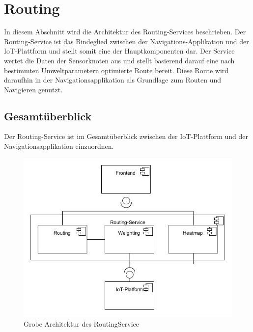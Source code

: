 \section{Routing}
\label{sec:arch:routing}
In diesem Abschnitt wird die Architektur des Routing-Services beschrieben. Der Routing-Service ist das Bindeglied zwischen der Navigations-Applikation und der IoT-Plattform und stellt somit eine der Hauptkomponenten dar. Der Service wertet die Daten der Sensorknoten aus und stellt basierend darauf eine nach bestimmten Umweltparametern optimierte Route bereit. Diese Route wird daraufhin in der Navigationsapplikation als Grundlage zum Routen und Navigieren genutzt.

\subsection{Gesamtüberblick}
Der Routing-Service ist im Gesamtüberblick zwischen der IoT-Plattform und der Navigationsapplikation einzuordnen.
\begin{figure}[htb]
	\centering
	\includegraphics[width=\textwidth]{./ressourcen/routing/routingKomponenten.png}
	\caption{Grobe Architektur des RoutingService}
	\label{fig:routing_Komponenten}
\end{figure}


